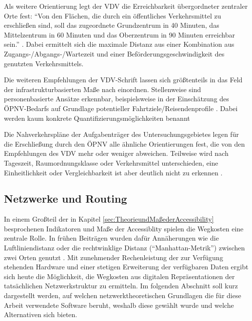 \documentclass[11pt,pdftex,a4paper]{scrartcl}
\begin{document}
	Als weitere Orientierung legt der VDV die Erreichbarkeit übergordneter zentraler Orte fest: \enquote{Von den Flächen, die durch ein öffentliches Verkehrsmittel zu erschließen sind, soll das zugeordnete Grundzentrum in \num{40} Minuten, das Mittelzentrum in \num{60} Minuten und das Oberzentrum in \num{90} Minuten erreichbar sein.} \parencite[18]{VDVSchrift4Verkehrserschliessung2019}. Dabei ermittelt sich die maximale Distanz aus einer Kombination aus Zugangs-/Abgangs-/Wartezeit und einer Beförderungsgeschwindigkeit des genutzten Verkehrsmittels. 
	
	Die weiteren Empfehlungen der VDV-Schrift lassen sich größtenteils in das Feld der infrastrukturbasierten Maße nach \textcite{geursAccessibilityEvaluationLanduse2004} einordnen. Stellenweise sind personenbasierte Ansätze erkennbar, beispielsweise in der Einschätzung des ÖPNV-Bedarfs auf Grundlage potentieller Fahrtziele/Reisendenprofile \parencite[23f]{VDVSchrift4Verkehrserschliessung2019}. Dabei werden kaum konkrete Quantifizierungsmöglichkeiten benannt
	
	Die Nahverkehrspläne der Aufgabenträger des Untersuchungsgebietes legen für die Erschließung durch den ÖPNV alle ähnliche Orientierungen fest, die von den Empfehlungen des VDV mehr oder weniger abweichen. Teilweise wird nach Tageszeit, Raumordnungsklasse oder Verkehrsmittel unterschieden, eine Einheitlichkeit oder Vergleichbarkeit ist aber deutlich nicht zu erkennen \parencite{go.rheinlandAuswertungNahverkehrsplaneOPNVAufgabentrager2026}.

	\subsection{Netzwerke und Routing}
	In einem Großteil der in Kapitel \ref{sec:TheorieundMaßederAccessibility} besprochenen Indikatoren und Maße der Accessiblity spielen die Wegkosten eine zentrale Rolle. In frühen Beiträgen wurden dafür Annäherungen wie die Luftliniendistanz oder die rechtwinklige Distanz (\enquote{Manhattan-Metrik}) zwischen zwei Orten genutzt \parencite[vgl.][103]{ingramConceptAccessibilitySearch1971}. Mit zunehmender Rechenleistung der zur Verfügung stehenden Hardware und einer stetigen Erweiterung der verfügbaren Daten ergibt sich heute die Möglichkeit, die Wegkosten aus digitalen Repräsentationen der tatsächlichen Netzwerkstruktur zu ermitteln. Im folgenden Abschnitt soll kurz dargestellt werden, auf welchen netzwerktheoretischen Grundlagen die für diese Arbeit verwendete Software beruht, weshalb diese gewählt wurde und welche Alternativen sich bieten.
\end{document}
